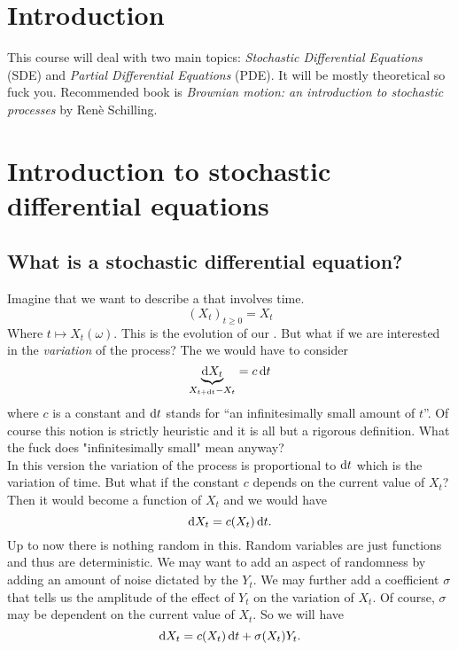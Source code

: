 \documentclass[crop=false, class=article]{standalone}
\begin{document}
\section{Introduction}
This course will deal with two main topics: \emph{Stochastic Differential Equations} (SDE) and \emph{Partial Differential Equations} (PDE). It will be mostly theoretical so fuck you. Recommended book is \textit{Brownian motion: an introduction to stochastic processes} by Renè Schilling.
\section{Introduction to stochastic differential equations}
\subsection{What is a stochastic differential equation?}
Imagine that we want to describe a \rp{} that involves time.
\begin{equation*}
	{(X_{t})}_{t\geq0}=X_{t}
\end{equation*}
Where $t\mapsto X_{t}(\omega)$. This is the evolution of our \rp{}. But what if we are interested in the \textit{variation} of the process? The we would have to consider
\begin{equation*}
	\underbrace{\mathop{}\!\mathrm{d} X_{t}}_{X_{t+\mathop{}\!\mathrm{d} t}-X_{t}}=c \mathop{}\!\mathrm{d} t
\end{equation*}
where $c$ is a constant and $\mathop{}\!\mathrm{d} t$ stands for ``an infinitesimally small amount of $t$''. Of course this notion is strictly heuristic and it is all but a rigorous definition. What the fuck does "infinitesimally small" mean anyway?\\
In this version the variation of the process is proportional to $\mathop{}\!\mathrm{d} t$ which is the variation of time. But what if the constant $c$ depends on the current value of $X_{t}$? Then it would become a function of $X_{t}$ and we would have
\begin{equation*}
	\mathop{}\!\mathrm{d} X_{t}=c(X_{t})\mathop{}\!\mathrm{d} t.
\end{equation*}
Up to now there is nothing random in this. Random variables are just functions and thus are deterministic. We may want to add an aspect of randomness by adding an amount of noise dictated by the \rv{} $Y_{t}$. We may further add a coefficient $\sigma$ that tells us the amplitude of the effect of $Y_{t}$ on the variation of $X_{t}$. Of course, $\sigma$ may be dependent on the current value of $X_{t}$. So we will have
\begin{equation*}
	\mathop{}\!\mathrm{d} X_{t}=c(X_{t})\mathop{}\!\mathrm{d} t+\sigma(X_{t})Y_{t}.
\end{equation*}
\end{document}

